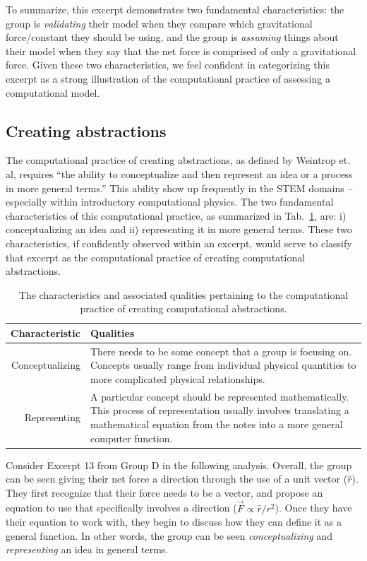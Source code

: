 \documentclass{msuphddissertation}
\begin{document}
\begin{doublespace}
To summarize, this excerpt demonstrates two fundamental characteristics: the group is \textit{validating} their model when they compare which gravitational force/constant they should be using, and the group is \textit{assuming} things about their model when they say that the net force is comprised of only a gravitational force.  Given these two characteristics, we feel confident in categorizing this excerpt as a strong illustration of the computational practice of assessing a computational model.

%
%
%
%
%
%
%
%
%
%
%
%
%
%
%
%

\subsection{Creating abstractions}

The computational practice of creating abstractions, as defined by Weintrop et. al, requires ``the ability to conceptualize and then represent an idea or a process in more general terms.''  This ability show up frequently in the STEM domains -- especially within introductory computational physics.  The two fundamental characteristics of this computational practice, as summarized in Tab.~\ref{CH5:CreatingAbstractions}, are: i) conceptualizing an idea and ii) representing it in more general terms.  These two characteristics, if confidently observed within an excerpt, would serve to classify that excerpt as the computational practice of creating computational abstractions.

\begin{table}
\begin{tabular}{r|p{}}
Characteristic & Qualities \\\hline\hline
Conceptualizing & There needs to be some concept that a group is focusing on.  Concepts usually range from individual physical quantities to more complicated physical relationships.\\
Representing & A particular concept should be represented mathematically.  This process of representation usually involves translating a mathematical equation from the notes into a more general computer function.
\end{tabular}\caption{The characteristics and associated qualities pertaining to the computational practice of creating computational abstractions.}\label{CH5:CreatingAbstractions}
\end{table}

Consider Excerpt 13 from Group D in the following analysis.  Overall, the group can be seen giving their net force a direction through the use of a unit vector ($\hat{r}$).  They first recognize that their force needs to be a vector, and propose an equation to use that specifically involves a direction ($\vec{F}\propto\hat{r}/r^{2}$).  Once they have their equation to work with, they begin to discuss how they can define it as a general function.  In other words, the group can be seen \textit{conceptualizing} and \textit{representing} an idea in general terms.


\end{doublespace}
\end{document}

